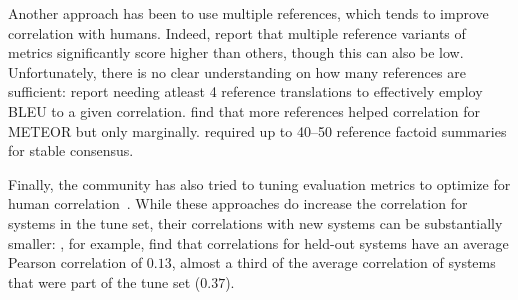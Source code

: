 Another approach has been to use multiple references, which tends to improve correlation with humans.
Indeed, \citet{toutanova2016dataset} report that multiple reference variants of metrics significantly score higher than others, though this can also be low.
Unfortunately, there is no clear understanding on how many references are sufficient: 
  \citet{culy2003limits} report needing atleast 4 reference translations to effectively employ BLEU to a given correlation.
  \citet{lavie2009meteor} find that more references helped correlation for METEOR but only marginally.
\citet{vanhalteren2003factoid} required up to 40--50 reference factoid summaries for stable consensus.

Finally, the community has also tried to tuning evaluation metrics to optimize for human correlation~\citep{lavie2009meteor,denkowski2014meteor,lowe2017towards}.
While these approaches do increase the correlation for systems in the tune set, their correlations with new systems can be substantially smaller: \citet{lowe2017towards}, for example, find that correlations for held-out systems have an average Pearson correlation of $0.13$, almost a third of the average correlation of systems that were part of the tune set ($0.37$).

